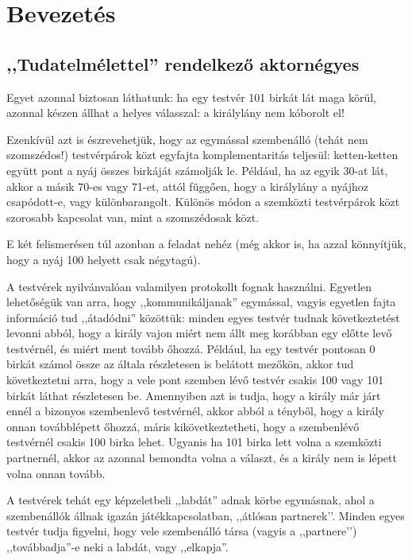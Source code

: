 \documentclass{article}
\begin{document}
	\section{Bevezetés}

	\subsection{,,Tudatelmélettel'' rendelkező aktornégyes}

	Egyet azonnal biztosan láthatunk: ha egy testvér 101 birkát lát maga körül, azonnal készen állhat a helyes válasszal: a királylány nem kóborolt el!

	Ezenkívül azt is észrevehetjük, hogy az egymással szembenálló (tehát nem szomszédos!) testvérpárok közt egyfajta komplementaritás teljesül: ketten-ketten együtt pont a nyáj összes birkáját számolják le. Például, ha az egyik 30-at lát, akkor a másik 70-es vagy 71-et, attól függően, hogy a királylány a nyájhoz csapódott-e, vagy különbarangolt. Különös módon a szemközti testvérpárok közt szorosabb kapcsolat van, mint a szomszédosak közt.

	E két felismerésen túl azonban a feladat nehéz (még akkor is, ha azzal könnyítjük, hogy a nyáj 100 helyett csak négytagú).
 
	A testvérek nyilvánvalóan valamilyen protokollt fognak használni. Egyetlen lehetőségük van arra, hogy ,,kommunikáljanak'' egymással, vagyis egyetlen fajta információ tud ,,átadódni'' közöttük: minden egyes testvér tudnak következtetést levonni abból, hogy a király vajon miért nem állt meg korábban egy előtte levő testvérnél, és miért ment tovább őhozzá. Például, ha egy testvér pontosan 0 birkát számol össze az általa részletesen is belátott mezőkön, akkor tud következtetni arra, hogy a vele pont szemben lévő testvér csakis 100 vagy 101 birkát láthat részletesen be. Amennyiben azt is tudja, hogy a király már járt ennél a bizonyos szembenlevő testvérnél, akkor abból a tényből, hogy a király onnan továbblépett őhozzá, máris kikövetkeztetheti, hogy a szembenlévő testvérnél csakis 100 birka lehet. Ugyanis ha 101 birka lett volna a szemközti partnernél, akkor az azonnal bemondta volna a választ, és a király nem is lépett volna onnan tovább.

	A testvérek tehát egy képzeletbeli ,,labdát'' adnak körbe egymásnak, ahol a szembenállók állnak igazán játékkapcsolatban, ,,átlósan partnerek’’. Minden egyes testvér tudja figyelni, hogy vele szembenálló társa (vagyis a ,,partnere’’) ,,továbbadja''-e neki a labdát, vagy ,,elkapja''.
\end{document}
